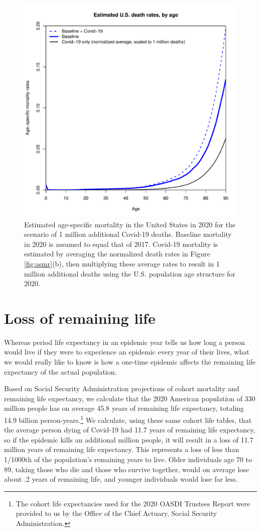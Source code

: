 \documentclass[9pt,twocolumn,twoside,lineno]{pnas-new}
\begin{document}
\begin{figure}%
\centering
\includegraphics[width=.8\linewidth]{./fig3_us_rates}
\caption{Estimated age-specific mortality in the United States in 2020
  for the scenario of 1 million additional Covid-19 deaths. Baseline
  mortality in 2020 is assumed to equal that of 2017. Covid-19
  mortality is estimated by averaging the normalized death rates in
  Figure \ref{fig:asmr}(b), then multiplying these average rates to
  result in 1 million additional deaths using the U.S. population age
  structure for 2020.}
\label{fig:baseline}
\end{figure}


\section*{Loss of remaining life}

Whereas period life expectancy in an epidemic year tells us how long a
person would live if they were to experience an epidemic every year of
their lives, what we would really like to know is how a one-time
epidemic affects the remaining life expectancy of the actual
population.

Based on Social Security Administration projections of cohort
mortality and remaining life expectancy, we calculate that the 2020
American population of 330 million people has on average 45.8 years of
remaining life expectancy, totaling 14.9 billion
person-years.\footnote{The cohort life expectancies used for the 2020
  OASDI Trustees Report \cite{oact:2020} were provided to us by the
  Office of the Chief Actuary, Social Security Administration.}  We
calculate, using these same cohort life tables, that the average
person dying of Covid-19 had 11.7 years of remaining life expectancy,
so if the epidemic kills an additional million people, it will result
in a loss of 11.7 million years of remaining life expectancy. This
represents a loss of less than 1/1000th of the population’s remaining
years to live.  Older individuals age 70 to 89, taking those who die
and those who survive together, would on average lose about .2 years
of remaining life, and younger individuals would lose far less.
\end{document}
